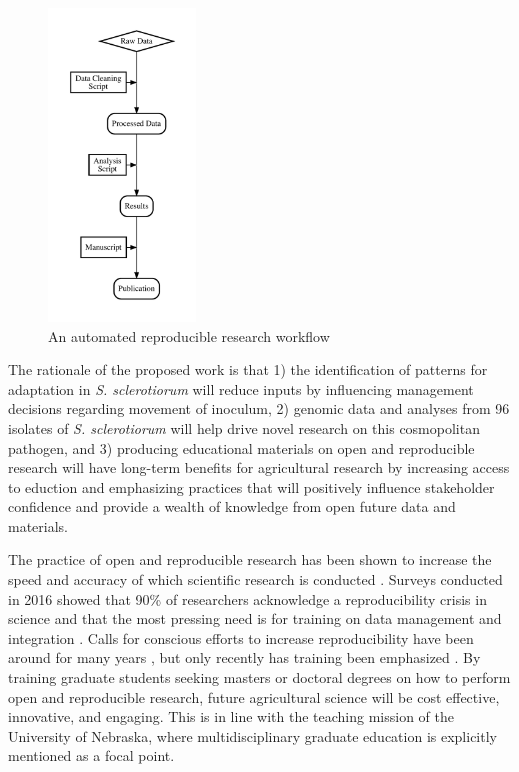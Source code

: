 \documentclass[12pt,letterpaper]{article}
\begin{document}
\begin{figure}  %
  \includegraphics[width=0.35\textwidth]{figure/rr.pdf}
  \caption{An automated reproducible research workflow}
  \label{fig:rr}
\end{figure}

The rationale of the proposed work is that 1) the identification of patterns for adaptation in \textit{S. sclerotiorum} will reduce inputs by influencing management decisions regarding movement of inoculum, 2) genomic data and analyses from 96 isolates of \textit{S. sclerotiorum} will help drive novel research on this cosmopolitan pathogen, and 3) producing educational materials on open and reproducible research will have long-term benefits for agricultural research by increasing access to eduction and emphasizing practices that will positively influence stakeholder confidence and provide a wealth of knowledge from open future data and materials. 

The practice of open and reproducible research has been shown to increase the speed and accuracy of which scientific research is conducted \citep{stewart-lowndes2017path, wilson2016good}.
Surveys conducted in 2016 showed that 90\% of researchers acknowledge a reproducibility crisis in science \citep{baker2016scientists} and that the most pressing need is for training on data management and integration \citep{barone2017unmet}. 
Calls for conscious efforts to increase reproducibility have been around for many years \citep{buckheit1995wavelab, peng2011reproducible}, but only recently has training been emphasized \citep{schmidt2016stepping, stewart-lowndes2017path, wilson2016good}. 
By training graduate students seeking masters or doctoral degrees on how to perform open and reproducible research, future agricultural science will be cost effective, innovative, and engaging. 
This is in line with the teaching mission of the University of Nebraska, where multidisciplinary graduate education is explicitly mentioned as a focal point.
\end{document}
